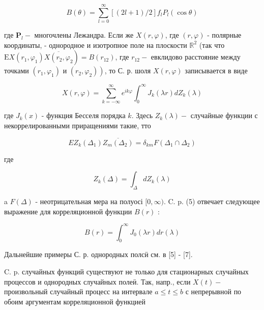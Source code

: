 \documentclass[10pt]{article}
\begin{document}
\[

B(\theta)=\sum_{l=0}^{\infty}[(2 l+1) / 2] f_{l} P_{l}(\cos \theta)

\]



где $\boldsymbol{P}_{l}-$ многочлены Лежандра. Если же $X(r, \varphi)$, где $(r, \varphi)$ - полярные координаты, - однородное и изотропное поле на плоскости $\mathbb{R}^{2}$ (так что $\left.\mathrm{E} X\left(r_{1}, \varphi_{1}\right) \overline{X\left(r_{2}, \varphi_{2}\right.}\right)=B\left(r_{12}\right)$, где $r_{12}-$ евклидово расстояние между точками $\left(r_{1}, \varphi_{1}\right)$ и $\left.\left(r_{2}, \varphi_{2}\right)\right)$, то С. р. шоля $X(r, \varphi)$ записывается в виде



\[

X(r, \varphi)=\sum_{k=-\infty}^{\infty} e^{i k \varphi} \int_{0}^{\infty} J_{k}(\lambda r) d Z_{k}(\lambda)

\]



где $J_{k}(x)$ - функция Бесселя порядка $k$. Здесь $Z_{k}(\lambda)-$ случайные функции с некоррелированными приращениями такие, тто



\[

E Z_{k}\left(\Delta_{1}\right) \overline{Z_{m}\left(\Delta_{2}\right)}=\delta_{k m} F\left(\Delta_{1} \cap \Delta_{2}\right)

\]



где



\[

Z_{k}(\Delta)=\int_{\Delta} d Z_{k}(\lambda)

\]



a $F(\Delta)$ - неотрицательная мера на полуосі $[0, \infty)$. C. p. (5) отвечает следующее выражение для корреляционной функции $B(r)$ :



\[

B(r)=\int_{0}^{\infty} J_{0}(\lambda r) d r(\lambda)

\]



Дальнейшие примеры С. р. однородных полсӥ см. в [5] - [7].



C. p. случайных функций существуют не только для стационарных случайных процессов и однородных случайных полеӥ. Так, напр., если $X(t)-$ произвольный случайный процесс на интервале $a \leqslant t \leqslant b$ с непрерывной по обоим аргументам корреляционной функцией
\end{document}
